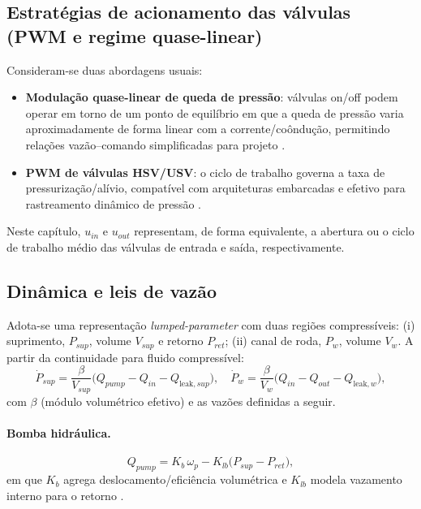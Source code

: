 \subsection{Estratégias de acionamento das válvulas (PWM e regime quase-linear)}
\label{sec:controle-4-1-1}

Consideram-se duas abordagens usuais:
\begin{itemize}
    \item \textbf{Modulação quase-linear de queda de pressão}: válvulas on/off podem operar em torno de um ponto de equilíbrio em que a queda de pressão varia aproximadamente de forma linear com a corrente/co\^ondução, permitindo relações vazão–comando simplificadas para projeto \cite{ChenLv2017}.
    \item \textbf{PWM de válvulas HSV/USV}: o ciclo de trabalho governa a taxa de pressurização/alívio, compatível com arquiteturas embarcadas e efetivo para rastreamento dinâmico de pressão \cite{HouhuaJing2022}.
\end{itemize}
Neste capítulo, $u_{in}$ e $u_{out}$ representam, de forma equivalente, a abertura ou o ciclo de trabalho médio das válvulas de entrada e saída, respectivamente.

\subsection{Dinâmica e leis de vazão}
\label{sec:controle-modelo-hidraulico-2p}

Adota-se uma representação \emph{lumped-parameter} com duas regiões compressíveis: (i) suprimento, $P_{sup}$, volume $V_{sup}$ e retorno $P_{ret}$; (ii) canal de roda, $P_w$, volume $V_w$. A partir da continuidade para fluido compressível:
\begin{equation}
    \dot{P}_{sup} = \frac{\beta}{V_{sup}}\Big(Q_{pump} - Q_{in} - Q_{\text{leak},sup}\Big),
    \quad
    \dot{P}_{w}   = \frac{\beta}{V_{w}}\Big(Q_{in} - Q_{out} - Q_{\text{leak},w}\Big),
    \label{eq:din_press}
\end{equation}
com $\beta$ (módulo volumétrico efetivo) e as vazões definidas a seguir.

\paragraph{Bomba hidráulica.}
\begin{equation}
    Q_{pump} = K_b\,\omega_p - K_{lb}\big(P_{sup}-P_{ret}\big),
    \label{eq:qpump_2p}
\end{equation}
em que $K_b$ agrega deslocamento/eficiência volumétrica e $K_{lb}$ modela vazamento interno para o retorno \cite{MotorParametricDesign2023,WangBingbing2015}.

